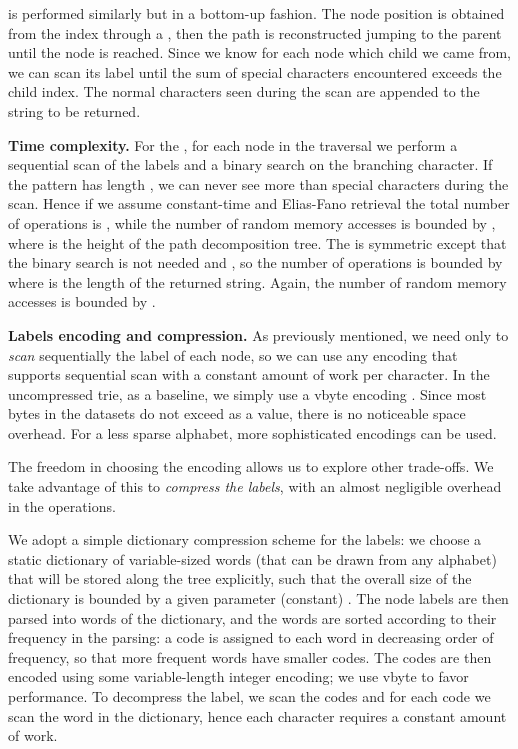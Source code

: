 \documentclass[a4paper,11pt]{article}
\newcommand{\ttlpar}[1]{\noindent\textbf{#1}}
\theoremstyle{nonumberplain}
\begin{document}
 is performed similarly but in a bottom-up fashion. The node
position is obtained from the index through a ,
then the path is reconstructed jumping to the parent until the node is
reached. Since we know for each node which child we came from, we can
scan its label until the sum of special characters encountered exceeds
the child index. The normal characters seen during the scan are
appended to the string to be returned.

\ttlpar{Time complexity.}
For the , for each node in the traversal we perform a
sequential scan of the labels and a binary search on the branching
character. If the pattern has length , we can never see more than
 special characters during the scan. Hence if we assume
constant-time  and Elias-Fano retrieval the total number
of operations is , while the number of random
memory accesses is bounded by , where  is the height of the
path decomposition tree. The  is symmetric except that the
binary search is not needed and , so the number of
operations is bounded by  where  is the length of the
returned string. Again, the number of random memory accesses is
bounded by .

\ttlpar{Labels encoding and compression.} 
As previously mentioned, we need only to \emph{scan} sequentially the
label of each node, so we can use any encoding
that supports sequential scan with a constant amount of work per
character.
In the uncompressed trie, as a baseline, we simply use a vbyte encoding
\cite{vbyte}. Since most bytes in the datasets do not exceed  as
a value, there is no noticeable space overhead. For a less sparse
alphabet, more sophisticated encodings can be used.

The freedom in choosing the encoding allows us to explore other
trade-offs. We take advantage of this to \emph{compress the labels},
with an almost negligible overhead in the operations.

We adopt a simple dictionary compression scheme for the labels: we
choose a static dictionary of variable-sized words (that can be drawn from any
alphabet) that will be stored along the tree explicitly, such
that the overall size of the dictionary is bounded by a given
parameter (constant) . The node labels are then parsed into words
of the dictionary, and the words are sorted according to their
frequency in the parsing: a code is assigned to each
word in decreasing order of frequency, so that more frequent words
have smaller codes. The codes are then encoded using some
variable-length integer encoding; we use vbyte to favor
performance.
To decompress the label, we scan the codes and for each code we scan
the word in the dictionary, hence each character requires a constant
amount of work. 
\end{document}
